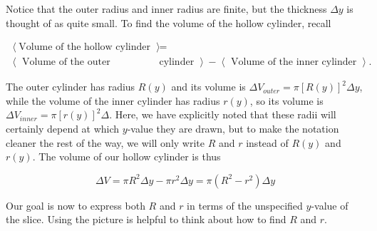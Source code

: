 \documentclass{ximera}
\begin{document}
\begin{model}
\begin{image}
            \end{image}

Notice that the outer radius and inner radius are finite, but the thickness $\Delta y$ is thought of as quite small.  To find the volume of the hollow cylinder, recall

\begin{align*}
\left< \textrm{Volume of the hollow cylinder } \right>  &=   \\
 \left< \textrm{ Volume of the outer } \right. & \left. \textrm{cylinder } \right> - \left< \textrm{ Volume of the inner cylinder } \right>.
\end{align*}
 
The outer cylinder has radius $R(y)$ and its volume is $\Delta V_{outer} = \pi [R(y)]^2 \Delta y$, while the volume of the inner cylinder has radius $r(y)$, so its volume is $\Delta V_{inner} = \pi [r(y)]^2 \Delta$.  Here, we have explicitly noted that these radii will certainly depend at which $y$-value they are drawn, but to make the notation cleaner the rest of the way, we will only write $R$ and $r$ instead of $R(y)$ and $r(y)$.  The volume of our hollow cylinder is thus
 
\[
\Delta V = \pi R^2 \Delta y -\pi r^2 \Delta y=\pi \left(R^2-r^2\right) \Delta y 
\]

Our goal is now to express both $R$ and $r$ in terms of the unspecified $y$-value of the slice.  Using the picture is helpful to think about how to find $R$ and $r$.


\end{model}
\end{document}
